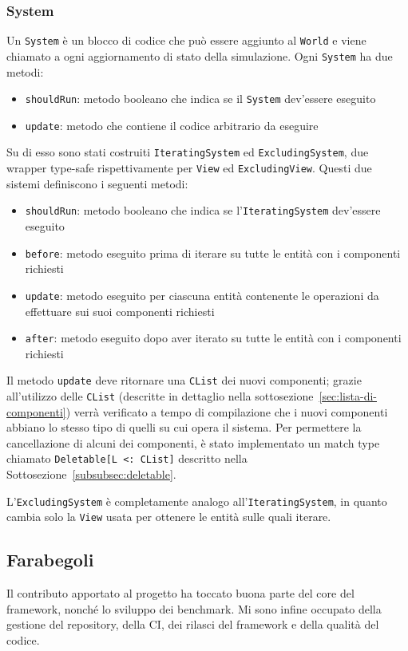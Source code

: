 \subsubsection{System}

Un \texttt{System} è un blocco di codice che può essere aggiunto al \texttt{World} e viene chiamato a ogni aggiornamento
di stato della simulazione.
Ogni \texttt{System} ha due metodi:
\begin{itemize}
    \item \texttt{shouldRun}: metodo booleano che indica se il \texttt{System} dev'essere eseguito
    \item \texttt{update}: metodo che contiene il codice arbitrario da eseguire
\end{itemize}

Su di esso sono stati costruiti \texttt{IteratingSystem} ed \texttt{ExcludingSystem}, due wrapper type-safe
rispettivamente per \texttt{View} ed \texttt{ExcludingView}.
Questi due sistemi definiscono i seguenti metodi:
\begin{itemize}
    \item \texttt{shouldRun}: metodo booleano che indica se l'\texttt{IteratingSystem} dev'essere eseguito
    \item \texttt{before}: metodo eseguito prima di iterare su tutte le entità con i componenti richiesti
    \item \texttt{update}: metodo eseguito per ciascuna entità contenente le operazioni da effettuare sui suoi
    componenti richiesti
    \item \texttt{after}: metodo eseguito dopo aver iterato su tutte le entità con i componenti richiesti
\end{itemize}

Il metodo \texttt{update} deve ritornare una \texttt{CList} dei nuovi componenti;
grazie all'utilizzo delle \texttt{CList} (descritte in dettaglio nella sottosezione~\ref{sec:lista-di-componenti})
verrà verificato a tempo di compilazione che i nuovi componenti abbiano lo stesso tipo di quelli su cui opera il
sistema.
Per permettere la cancellazione di alcuni dei componenti, è stato implementato un match type chiamato
\texttt{Deletable[L~<:~CList]} descritto nella Sottosezione~\ref{subsubsec:deletable}.

L'\texttt{ExcludingSystem} è completamente analogo all'\texttt{IteratingSystem}, in quanto cambia solo la \texttt{View}
usata per ottenere le entità sulle quali iterare.

\subsection{Farabegoli}\label{subsec:farabegoli}
Il contributo apportato al progetto ha toccato buona parte del core del framework, nonché lo sviluppo dei benchmark.
Mi sono infine occupato della gestione del repository, della CI, dei rilasci del framework e della qualità del codice.

